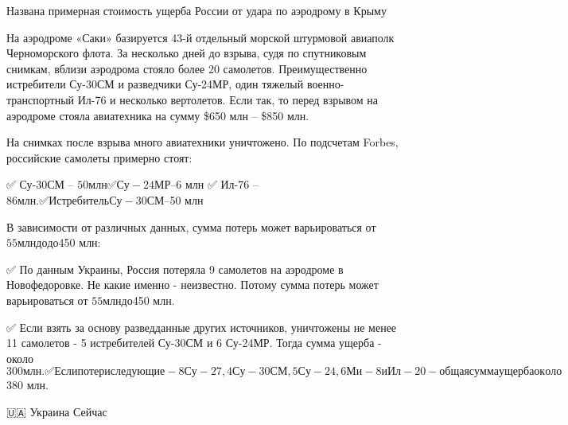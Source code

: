  
 
 
 
 

Названа примерная стоимость ущерба России от удара по аэродрому в Крыму

На аэродроме «Саки» базируется 43-й отдельный морской штурмовой авиаполк
Черноморского флота. За несколько дней до взрыва, судя по спутниковым снимкам,
вблизи аэродрома стояло более 20 самолетов. Преимущественно истребители Су-30СМ
и разведчики Су-24МР, один тяжелый военно-транспортный Ил-76 и несколько
вертолетов. Если так, то перед взрывом на аэродроме стояла авиатехника на сумму
\$650 млн – \$850 млн.

На снимках после взрыва много авиатехники уничтожено. По подсчетам Forbes, российские самолеты примерно стоят:

✅ Су-30СМ – $50 млн
✅ Су-24МР – $6 млн
✅ Ил-76 – $86 млн.
✅ Истребитель Су-30СМ – $50 млн

В зависимости от различных данных, сумма потерь может варьироваться от $55 млн до до $450 млн:

✅ По данным Украины, Россия потеряла 9 самолетов на аэродроме в Новофедоровке.
Не какие именно - неизвестно. Потому сумма потерь может варьироваться от $55
млн до $450 млн.

✅ Если взять за основу разведданные других источников, уничтожены не менее 11
самолетов - 5 истребителей Су-30СМ и 6 Су-24МР. Тогда сумма ущерба - около $300
млн.

✅ Если потери следующие - 8 Су-27, 4 Су-30СМ, 5 Су-24, 6 Ми-8 и Ил-20 - общая
сумма ущерба около $380 млн.

🇺🇦 Украина Сейчас
